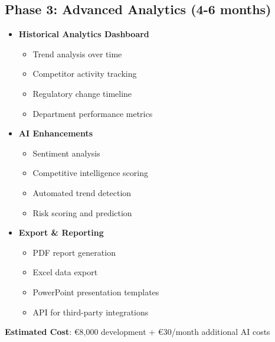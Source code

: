\documentclass[11pt,a4paper]{article}
\begin{document}
\subsection{Phase 3: Advanced Analytics (4-6 months)}
\begin{itemize}[leftmargin=*]
    \item \textbf{Historical Analytics Dashboard}
    \begin{itemize}
        \item Trend analysis over time
        \item Competitor activity tracking
        \item Regulatory change timeline
        \item Department performance metrics
    \end{itemize}
    
    \item \textbf{AI Enhancements}
    \begin{itemize}
        \item Sentiment analysis
        \item Competitive intelligence scoring
        \item Automated trend detection
        \item Risk scoring and prediction
    \end{itemize}
    
    \item \textbf{Export \& Reporting}
    \begin{itemize}
        \item PDF report generation
        \item Excel data export
        \item PowerPoint presentation templates
        \item API for third-party integrations
    \end{itemize}
\end{itemize}

\textbf{Estimated Cost}: \euro 8,000 development + \euro 30/month additional AI costs
\end{document}
